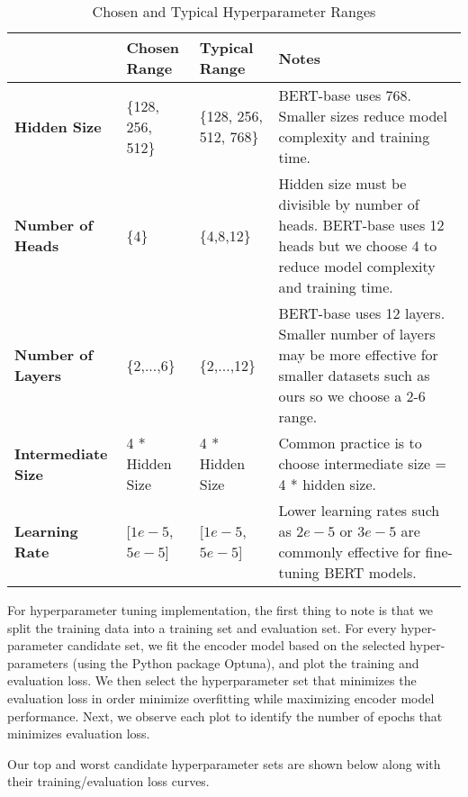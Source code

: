\documentclass[12pt,letterpaper]{article}
\begin{document}
\begin{table}[H]
    \centering
    \renewcommand{\arraystretch}{1.25}{\fontsize{11}{12}\selectfont
    \begin{tabular}{|p{3.5cm}|p{2cm}|p{3cm}|p{6cm}|}
        \hline
          & \textbf{Chosen Range} & \textbf{Typical Range} & \textbf{Notes} \\
        \hline
        \textbf{Hidden Size} & \{128, 256, 512\} & \{128, 256, 512, 768\} & BERT-base uses 768. Smaller sizes reduce model complexity and training time.  \\
        \textbf{Number of Heads} & \{4\} & \{4,8,12\} & Hidden size must be divisible by number of heads. BERT-base uses 12 heads but we choose 4 to reduce model complexity and training time.  \\
        \textbf{Number of Layers} & \{2,...,6\} & \{2,...,12\} & BERT-base uses 12 layers. Smaller number of layers may be more effective for smaller datasets such as ours so we choose a 2-6 range.  \\
        \textbf{Intermediate Size} & 4 * Hidden Size & 4 * Hidden Size & Common practice is to choose intermediate size = 4 * hidden size.  \\
        \textbf{Learning Rate} & [$1e-5$, $5e-5$] & [$1e-5$, $5e-5$] & Lower learning rates such as $2e-5$ or $3e-5$ are commonly effective for fine-tuning BERT models.  \\
        \hline
    \end{tabular}
    \caption{Chosen and Typical Hyperparameter Ranges}
    }
    \label{tab:accuracy_values}
\end{table}


For hyperparameter tuning implementation, the first thing to note is that we split the training data into a training set and evaluation set. For every hyper-parameter candidate set, we fit the encoder model based on the selected hyper-parameters (using the Python package Optuna), and plot the training and evaluation loss. We then select the hyperparameter set that minimizes the evaluation loss in order minimize overfitting while maximizing encoder model performance. Next, we observe each plot to identify the number of epochs that minimizes evaluation loss. 

Our top and worst candidate hyperparameter sets are shown below along with their training/evaluation loss curves.
\end{document}
